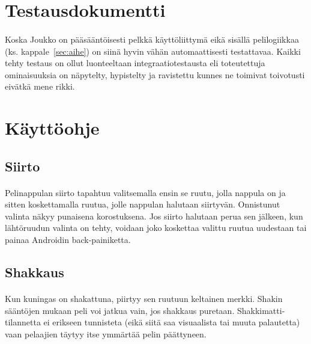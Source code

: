 \documentclass[11pt]{article}
\begin{document}
\paragraph{}


\section{Testausdokumentti}

\paragraph{} Koska Joukko on pääsääntöisesti pelkkä käyttöliittymä eikä sisällä pelilogiikkaa (ks. kappale~\ref{sec:aihe}) on siinä hyvin vähän automaattisesti testattavaa. Kaikki tehty testaus on ollut luonteeltaan integraatiotestausta eli toteutettuja ominaisuuksia on näpytelty, hypistelty ja ravistettu kunnes ne toimivat toivotusti eivätkä mene rikki.

\section{Käyttöohje}

\subsection{Siirto}

\paragraph{} Pelinappulan siirto tapahtuu valitsemalla ensin se ruutu, jolla nappula on ja sitten koskettamalla ruutua, jolle nappulan halutaan siirtyvän. Onnistunut valinta näkyy punaisena korostuksena. Jos siirto halutaan perua sen jälkeen, kun lähtöruudun valinta on tehty, voidaan joko koskettaa valittu ruutua uudestaan tai painaa Androidin back-painiketta.

\subsection{Shakkaus}

\paragraph{} Kun kuningas on shakattuna, piirtyy sen ruutuun keltainen merkki. Shakin sääntöjen mukaan peli voi jatkua vain, jos shakkaus puretaan. Shakkimatti-tilannetta ei erikseen tunnisteta (eikä siitä saa visuaalista tai muuta palautetta) vaan pelaajien täytyy itse ymmärtää pelin päättyneen.
\end{document}
